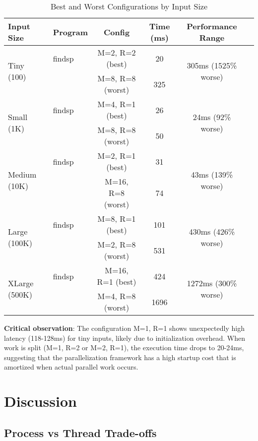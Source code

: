 \documentclass[11pt]{article}
\begin{document}
\begin{table}[H]
\centering
\caption{Best and Worst Configurations by Input Size}
\begin{tabular}{llcccc}
\toprule
Input Size & Program & Config & Time (ms) & Performance Range \\
\midrule
\multirow{2}{*}{Tiny (100)} & findsp & M=2, R=2 (best) & 20 & \multirow{2}{*}{305ms (1525\% worse)} \\
                             &        & M=8, R=8 (worst) & 325 & \\
\multirow{2}{*}{Small (1K)} & findsp & M=4, R=1 (best) & 26 & \multirow{2}{*}{24ms (92\% worse)} \\
                             &        & M=8, R=8 (worst) & 50 & \\
\multirow{2}{*}{Medium (10K)} & findsp & M=2, R=1 (best) & 31 & \multirow{2}{*}{43ms (139\% worse)} \\
                               &        & M=16, R=8 (worst) & 74 & \\
\multirow{2}{*}{Large (100K)} & findsp & M=8, R=1 (best) & 101 & \multirow{2}{*}{430ms (426\% worse)} \\
                               &        & M=2, R=8 (worst) & 531 & \\
\multirow{2}{*}{XLarge (500K)} & findsp & M=16, R=1 (best) & 424 & \multirow{2}{*}{1272ms (300\% worse)} \\
                                &        & M=4, R=8 (worst) & 1696 & \\
\bottomrule
\end{tabular}
\end{table}

\textbf{Critical observation}: The configuration M=1, R=1 shows unexpectedly high latency (118-128ms) for tiny inputs, likely due to initialization overhead. When work is split (M=1, R=2 or M=2, R=1), the execution time drops to 20-24ms, suggesting that the parallelization framework has a high startup cost that is amortized when actual parallel work occurs.

\section{Discussion}

\subsection{Process vs Thread Trade-offs}
\end{document}
